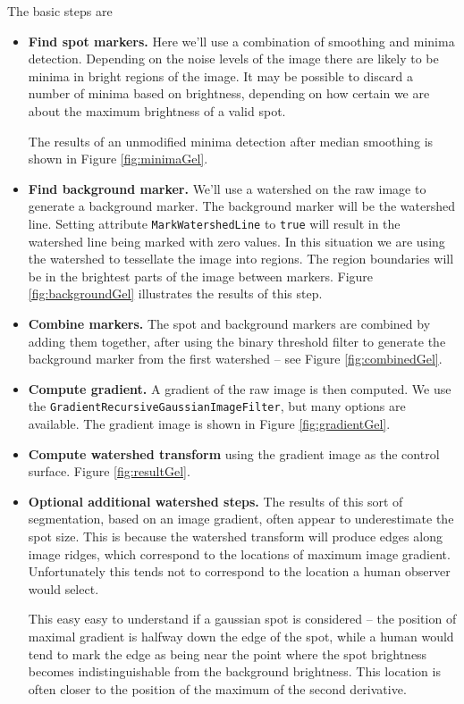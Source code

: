 \documentclass{InsightArticle}
\begin{document}
The basic steps are
\begin{itemize}
\item {\bf Find spot markers.} Here we'll use a combination of smoothing 
and minima detection. Depending on the noise levels of the image there
are likely to be minima in bright regions of the image. It may be
possible to discard a number of minima based on brightness, depending
on how certain we are about the maximum brightness of a valid spot.

The results of an unmodified minima detection after median smoothing
is shown in Figure \ref{fig:minimaGel}.
\item {\bf Find background marker.} We'll use a watershed on the raw image 
to generate a background marker. The background marker will be the
watershed line. Setting attribute \verb$MarkWatershedLine$ to
\verb$true$ will result in the watershed line being marked with zero 
values. In this situation we are using the watershed to tessellate the
image into regions. The region boundaries will be in the brightest
parts of the image between markers. Figure \ref{fig:backgroundGel} 
illustrates the results of this step.
\item {\bf Combine markers.} The spot and background markers are combined 
by adding them together, after using the binary threshold filter to
generate the background marker from the first watershed -- see Figure \ref{fig:combinedGel}.
\item {\bf Compute gradient.} A gradient of the raw image is then computed. 
We use the {\tt GradientRecursiveGaussianImageFilter}, but many
options are available. The gradient image is shown in Figure
\ref{fig:gradientGel}.
\item {\bf Compute watershed transform} using the gradient image as the 
control surface. Figure \ref{fig:resultGel}.
\item {\bf Optional additional watershed steps.} The results of this sort 
of segmentation, based on an image gradient, often appear to
underestimate the spot size. This is because the watershed transform
will produce edges along image ridges, which correspond to the
locations of maximum image gradient. Unfortunately this tends not to
correspond to the location a human observer would select. 

This easy easy to understand if a gaussian spot is considered -- the
position of maximal gradient is halfway down the edge of the spot,
while a human would tend to mark the edge as being near the point
where the spot brightness becomes indistinguishable from the
background brightness. This location is often closer to the position
of the maximum of the second derivative.


\end{itemize}
\end{document}
